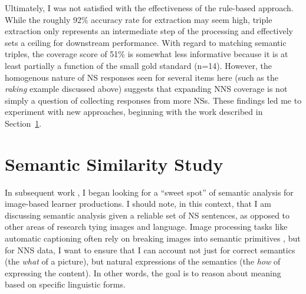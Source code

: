 Ultimately, I was not satisfied with the effectiveness of the rule-based approach. While the roughly 92\% accuracy rate for extraction may seem high, triple extraction only represents an intermediate step of the processing and effectively sets a ceiling for downstream performance. With regard to matching semantic triples, the coverage score of 51\% is somewhat less informative because it is at least partially a function of the small gold standard (n=14). However, the homogenous nature of NS responses seen for several items here (such as the \textit{raking} example discussed above) suggests that expanding NNS coverage is not simply a question of collecting responses from more NSs. These findings led me to experiment with new approaches, beginning with the work described in Section~\ref{sec:2016work}.


\section{Semantic Similarity Study}
\label{sec:2016work}

In subsequent work \citep{king:dickinson:16}, I began looking for a ``sweet spot'' of
semantic analysis \citep[cf.][]{bailey:meurers:08} for image-based learner productions. I should note, in this context, that I am discussing semantic analysis given a reliable set of NS sentences, as opposed to other areas of research tying images and language. Image processing tasks like automatic captioning often rely on breaking images into semantic primitives \citep[see, e.g.,][and references therein]{ortiz:wolff:lapata:15}, but for NNS data, I want to ensure that I can account not just for correct semantics (the \emph{what} of a picture), but natural expressions of the semantics (the \emph{how} of expressing the content).  In other words, the goal is to reason about meaning based on specific linguistic forms.

